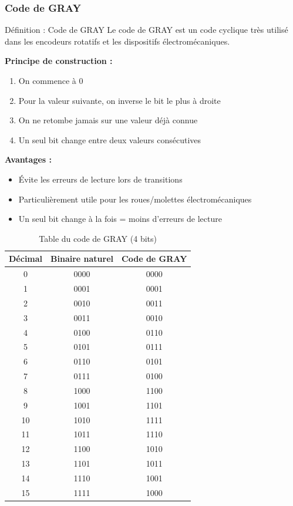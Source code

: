 \documentclass[a4paper,12pt]{article}
\begin{document}
\newpage
\subsubsection{Code de GRAY}

\begin{defbox}{Définition : Code de GRAY}
Le code de GRAY est un code cyclique très utilisé dans les encodeurs rotatifs et les dispositifs électromécaniques.

\textbf{Principe de construction :}

\begin{enumerate}
    \item On commence à 0
    \item Pour la valeur suivante, on inverse le bit le plus à droite
    \item On ne retombe jamais sur une valeur déjà connue
    \item Un seul bit change entre deux valeurs consécutives
\end{enumerate}

\textbf{Avantages :}

\begin{itemize}
    \item Évite les erreurs de lecture lors de transitions
    \item Particulièrement utile pour les roues/molettes électromécaniques
    \item Un seul bit change à la fois = moins d'erreurs de lecture
\end{itemize}
\end{defbox}

\begin{table}[h]
\centering
\begin{tabular}{c|c|c}
\toprule
\textbf{Décimal} & \textbf{Binaire naturel} & \textbf{Code de GRAY} \\
\midrule
0 & 0000 & 0000 \\
1 & 0001 & 0001 \\
2 & 0010 & 0011 \\
3 & 0011 & 0010 \\
4 & 0100 & 0110 \\
5 & 0101 & 0111 \\
6 & 0110 & 0101 \\
7 & 0111 & 0100 \\
8 & 1000 & 1100 \\
9 & 1001 & 1101 \\
10 & 1010 & 1111 \\
11 & 1011 & 1110 \\
12 & 1100 & 1010 \\
13 & 1101 & 1011 \\
14 & 1110 & 1001 \\
15 & 1111 & 1000 \\
\bottomrule
\end{tabular}
\caption{Table du code de GRAY (4 bits)}
\end{table}
\end{document}
